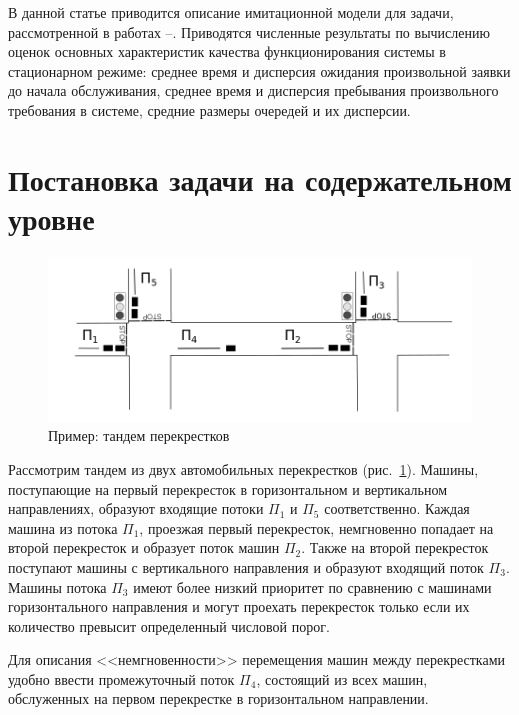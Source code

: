 \documentclass[11pt]{ubs}
\begin{document}
В данной статье приводится описание имитационной модели для задачи, рассмотренной в работах \cite{Kocheganov:2017:3}--\cite{Kocheganov:2017:2}. Приводятся численные результаты по вычислению оценок основных характеристик качества функционирования системы в стационарном режиме: среднее время и дисперсия ожидания произвольной заявки до начала обслуживания, среднее время и дисперсия пребывания произвольного требования в системе, средние размеры очередей и их дисперсии.





\section{Постановка задачи на содержательном уровне}

\begin{figure}[t]
\centering
\includegraphics[scale=0.35]{Crossroads_grayscale.png}
\caption{Пример: тандем перекрестков}
\label{crossroads}
\end{figure}
Рассмотрим тандем из двух автомобильных перекрестков (рис.~\ref{crossroads}).
Машины, поступающие на первый перекресток в горизонтальном и вертикальном направлениях, образуют входящие потоки $\Pi_1$ и $\Pi_5$ соответственно. Каждая машина из потока $\Pi_1$, проезжая первый перекресток, немгновенно попадает на второй перекресток и образует поток машин $\Pi_2$. Также на второй перекресток поступают машины с вертикального направления и образуют входящий поток $\Pi_3$. Машины потока $\Pi_3$ имеют более низкий приоритет по сравнению с машинами горизонтального направления и могут проехать перекресток только если их количество превысит определенный числовой порог.

Для описания <<немгновенности>> перемещения машин между перекрестками удобно ввести промежуточный поток $\Pi_4$, состоящий из всех машин, обслуженных на первом перекрестке в горизонтальном направлении. 
\end{document}
